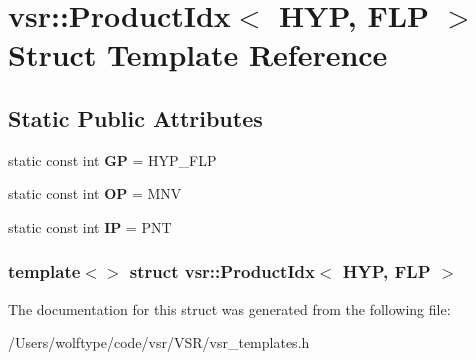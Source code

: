 \hypertarget{structvsr_1_1_product_idx_3_01_h_y_p_00_01_f_l_p_01_4}{\section{vsr\-:\-:Product\-Idx$<$ H\-Y\-P, F\-L\-P $>$ Struct Template Reference}
\label{structvsr_1_1_product_idx_3_01_h_y_p_00_01_f_l_p_01_4}
}
\subsection*{Static Public Attributes}
\begin{DoxyCompactItemize}
\item 
\hypertarget{structvsr_1_1_product_idx_3_01_h_y_p_00_01_f_l_p_01_4_a8fd8b72d9eab06984c0963ae1dfbfe7d}{static const int {\bfseries G\-P} = H\-Y\-P\-\_\-\-F\-L\-P}\label{structvsr_1_1_product_idx_3_01_h_y_p_00_01_f_l_p_01_4_a8fd8b72d9eab06984c0963ae1dfbfe7d}

\item 
\hypertarget{structvsr_1_1_product_idx_3_01_h_y_p_00_01_f_l_p_01_4_a2580f98c55dd1ff932d06fc7a1bdfd56}{static const int {\bfseries O\-P} = M\-N\-V}\label{structvsr_1_1_product_idx_3_01_h_y_p_00_01_f_l_p_01_4_a2580f98c55dd1ff932d06fc7a1bdfd56}

\item 
\hypertarget{structvsr_1_1_product_idx_3_01_h_y_p_00_01_f_l_p_01_4_a97f94f43f66b7c41423249e2790a01a2}{static const int {\bfseries I\-P} = P\-N\-T}\label{structvsr_1_1_product_idx_3_01_h_y_p_00_01_f_l_p_01_4_a97f94f43f66b7c41423249e2790a01a2}

\end{DoxyCompactItemize}
\subsubsection*{template$<$$>$ struct vsr\-::\-Product\-Idx$<$ H\-Y\-P, F\-L\-P $>$}



The documentation for this struct was generated from the following file\-:\begin{DoxyCompactItemize}
\item 
/\-Users/wolftype/code/vsr/\-V\-S\-R/vsr\-\_\-templates.\-h\end{DoxyCompactItemize}
